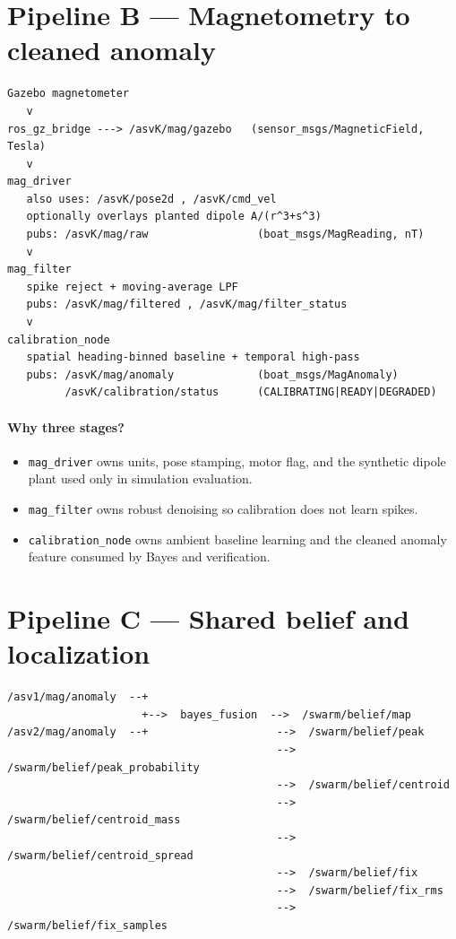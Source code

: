 \section{Pipeline B --- Magnetometry to cleaned anomaly}
\begin{verbatim}
Gazebo magnetometer
   v
ros_gz_bridge ---> /asvK/mag/gazebo   (sensor_msgs/MagneticField, Tesla)
   v
mag_driver
   also uses: /asvK/pose2d , /asvK/cmd_vel
   optionally overlays planted dipole A/(r^3+s^3)
   pubs: /asvK/mag/raw                 (boat_msgs/MagReading, nT)
   v
mag_filter
   spike reject + moving-average LPF
   pubs: /asvK/mag/filtered , /asvK/mag/filter_status
   v
calibration_node
   spatial heading-binned baseline + temporal high-pass
   pubs: /asvK/mag/anomaly             (boat_msgs/MagAnomaly)
         /asvK/calibration/status      (CALIBRATING|READY|DEGRADED)
\end{verbatim}

\paragraph{Why three stages?}
\begin{itemize}[leftmargin=*]
  \item \texttt{mag\_driver} owns units, pose stamping, motor flag, and the
        synthetic dipole plant used only in simulation evaluation.
  \item \texttt{mag\_filter} owns robust denoising so calibration does not
        learn spikes.
  \item \texttt{calibration\_node} owns ambient baseline learning and the
        cleaned anomaly feature consumed by Bayes and verification.
\end{itemize}

\section{Pipeline C --- Shared belief and localization}
\begin{verbatim}
/asv1/mag/anomaly  --+
                     +-->  bayes_fusion  -->  /swarm/belief/map
/asv2/mag/anomaly  --+                    -->  /swarm/belief/peak
                                          -->  /swarm/belief/peak_probability
                                          -->  /swarm/belief/centroid
                                          -->  /swarm/belief/centroid_mass
                                          -->  /swarm/belief/centroid_spread
                                          -->  /swarm/belief/fix
                                          -->  /swarm/belief/fix_rms
                                          -->  /swarm/belief/fix_samples
\end{verbatim}

